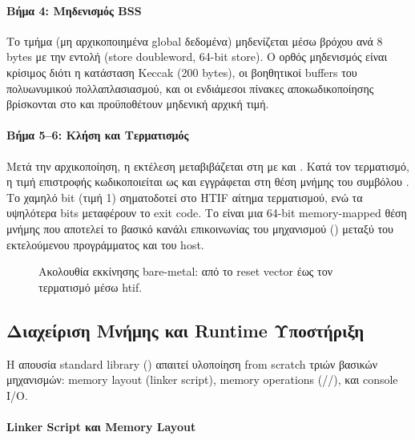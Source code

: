 \paragraph{Βήμα 4: Μηδενισμός BSS}

Το τμήμα  (μη αρχικοποιημένα global δεδομένα) μηδενίζεται μέσω
βρόχου ανά \num{8} bytes με την εντολή  (store
doubleword, \num{64}-bit store). Ο ορθός μηδενισμός είναι κρίσιμος διότι
η κατάσταση Keccak (\num{200} bytes), οι βοηθητικοί buffers του πολυωνυμικού
πολλαπλασιασμού, και οι ενδιάμεσοι πίνακες αποκωδικοποίησης βρίσκονται στο
 και προϋποθέτουν μηδενική αρχική τιμή.

\paragraph{Βήμα 5–6: Κλήση  και Τερματισμός}

Μετά την αρχικοποίηση, η εκτέλεση μεταβιβάζεται στη  με
 και . Κατά τον τερματισμό, η τιμή
επιστροφής κωδικοποιείται ως  και εγγράφεται στη
θέση μνήμης του συμβόλου . Το χαμηλό bit (τιμή 1) 
σηματοδοτεί στο HTIF αίτημα τερματισμού, ενώ τα υψηλότερα bits 
μεταφέρουν το exit code. Το  είναι μια 64-bit
memory-mapped θέση μνήμης που αποτελεί το βασικό κανάλι επικοινωνίας
του μηχανισμού  () μεταξύ του
εκτελούμενου προγράμματος και του host.

\begin{figure}[htbp]
  \centering
  \resizebox{0.65\textwidth}{!}{}
  \caption[Bare-metal boot sequence]{Ακολουθία εκκίνησης bare-metal: από το reset vector έως τον
  τερματισμό μέσω \gls{htif}.}
  \label{fig:boot-sequence}
\end{figure}

\subsection{Διαχείριση Μνήμης και Runtime Υποστήριξη}
\label{ssec:memory-management}

Η απουσία standard library () απαιτεί υλοποίηση from 
scratch τριών βασικών μηχανισμών: memory layout (linker script), memory operations
(//), και console I/O.

\paragraph{Linker Script και Memory Layout}

